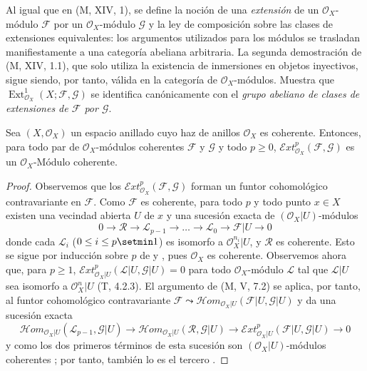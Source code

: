 \begin{env}[12.3.2]
\label{0.12.3.2}
\label{0.12.3.2-fr}
Al igual que en (M, XIV, 1), se define la noción de una
\emph{extensión} de un $\mathcal O_X$-módulo $\mathcal F$ por un
$\mathcal O_X$-módulo $\mathcal G$ y la ley de composición sobre las clases de
extensiones equivalentes: los argumentos utilizados para los módulos se
trasladan manifiestamente a una categoría abeliana arbitraria.
La segunda demostración de (M, XIV, 1.1), que solo utiliza la existencia de
inmersiones en objetos inyectivos, sigue siendo, por tanto, válida en la
categoría de $\mathcal O_X$-módulos.  Muestra que
$\operatorname{Ext}_{\mathcal O_X}^1(X;\mathcal F,\mathcal G)$
se identifica canónicamente con el \emph{grupo abeliano de clases de
extensiones de $\mathcal F$ por $\mathcal G$}.
\end{env}

\begin{proposition}[12.3.3]
\label{0.12.3.3}
\label{0.12.3.3-fr}
Sea $(X,\mathcal O_X)$ un espacio anillado cuyo haz de anillos
$\mathcal O_X$ es coherente.
Entonces, para todo par de $\mathcal O_X$-módulos coherentes $\mathcal F$ y
$\mathcal G$ y todo $p\geq0$,
$\mathcal{E}xt_{\mathcal O_X}^p(\mathcal F,\mathcal G)$
es un $\mathcal O_X$-Módulo coherente.
\end{proposition}

\begin{proof}
Observemos que los $\mathcal{E}xt_{\mathcal O_X}^p(\mathcal F,\mathcal G)$ forman un funtor cohomológico
contravariante en $\mathcal F$.
Como $\mathcal F$ es coherente, para todo $p$ y todo punto $x\in X$
existen una vecindad abierta $U$ de $x$ y una sucesión exacta de $(\mathcal O_X|U)$-módulos
\[
0\longrightarrow\mathcal R\longrightarrow\mathcal L_{p-1}
\longrightarrow\ldots\longrightarrow\mathcal L_0
\longrightarrow\mathcal F|U\longrightarrow0
\]
donde cada $\mathcal L_i$ ($0\leq i\leq p\setmin 1$) es isomorfo a
$\mathcal O_X^{n_i}|U$, y $\mathcal R$ es coherente.
Esto se sigue por inducción sobre $p$ de
 y
, pues $\mathcal O_X$ es coherente. Observemos ahora que, para $p\geq1$,
$\mathcal{E}xt_{\mathcal O_X|U}^p(\mathcal L|U,\mathcal G|U)=0$
para todo $\mathcal O_X$-módulo $\mathcal L$ tal que $\mathcal L|U$ sea
isomorfo a $\mathcal O_X^n|U$ (T, 4.2.3).
El argumento de (M, V, 7.2) se aplica, por tanto, al funtor cohomológico
contravariante
$\mathcal F\leadsto
\mathcal{H}om_{\mathcal O_X|U}(\mathcal F|U,\mathcal G|U)$
y da una sucesión exacta
\[
\mathcal{H}om_{\mathcal O_X|U}(\mathcal L_{p-1},\mathcal G|U)
\longrightarrow
\mathcal{H}om_{\mathcal O_X|U}(\mathcal R,\mathcal G|U)
\longrightarrow
\mathcal{E}xt_{\mathcal O_X|U}^p(\mathcal F|U,\mathcal G|U)
\longrightarrow0
\] y como los dos primeros términos de esta sucesión son $(\mathcal O_X|U)$-módulos coherentes
; por tanto, también lo es el tercero
.
\end{proof}

